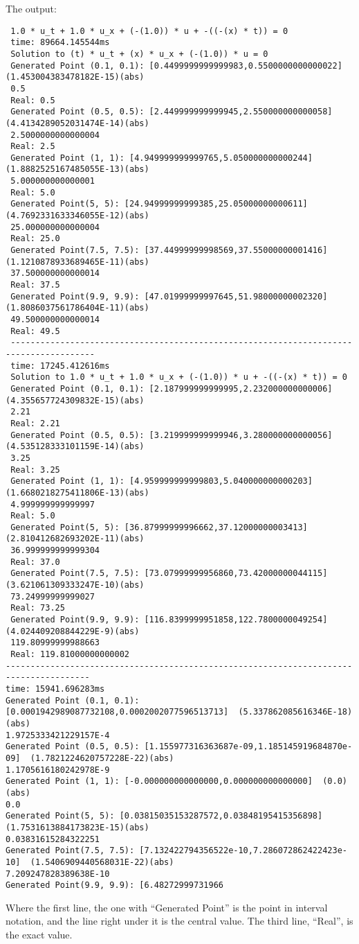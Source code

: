 \noindent The output:
\begingroup
\fontsize{9pt}{12pt}
\begin{verbatim}
 1.0 * u_t + 1.0 * u_x + (-(1.0)) * u + -((-(x) * t)) = 0
 time: 89664.145544ms
 Solution to (t) * u_t + (x) * u_x + (-(1.0)) * u = 0
 Generated Point (0.1, 0.1): [0.4499999999999983,0.5500000000000022]  (1.453004383478182E-15)(abs)
 0.5
 Real: 0.5
 Generated Point (0.5, 0.5): [2.449999999999945,2.550000000000058]  (4.4134289052031474E-14)(abs)
 2.5000000000000004
 Real: 2.5
 Generated Point (1, 1): [4.949999999999765,5.050000000000244]  (1.8882525167485055E-13)(abs)
 5.000000000000001
 Real: 5.0
 Generated Point(5, 5): [24.94999999999385,25.05000000000611]  (4.7692331633346055E-12)(abs)
 25.000000000000004
 Real: 25.0
 Generated Point(7.5, 7.5): [37.44999999998569,37.55000000001416]  (1.1210878933689465E-11)(abs)
 37.500000000000014
 Real: 37.5
 Generated Point(9.9, 9.9): [47.01999999997645,51.98000000002320]  (1.8086037561786404E-11)(abs)
 49.500000000000014
 Real: 49.5
 ---------------------------------------------------------------------------------------
 time: 17245.412616ms
 Solution to 1.0 * u_t + 1.0 * u_x + (-(1.0)) * u + -((-(x) * t)) = 0
 Generated Point (0.1, 0.1): [2.187999999999995,2.232000000000006]  (4.355657724309832E-15)(abs)
 2.21
 Real: 2.21
 Generated Point (0.5, 0.5): [3.219999999999946,3.280000000000056]  (4.535128333101159E-14)(abs)
 3.25
 Real: 3.25
 Generated Point (1, 1): [4.959999999999803,5.040000000000203]  (1.6680218275411806E-13)(abs)
 4.999999999999997
 Real: 5.0
 Generated Point(5, 5): [36.87999999996662,37.12000000003413]  (2.810412682693202E-11)(abs)
 36.999999999999304
 Real: 37.0
 Generated Point(7.5, 7.5): [73.07999999956860,73.42000000044115]  (3.621061309333247E-10)(abs)
 73.24999999999027
 Real: 73.25
 Generated Point(9.9, 9.9): [116.8399999951858,122.7800000049254]  (4.024409208844229E-9)(abs)
 119.80999999988663
 Real: 119.81000000000002
---------------------------------------------------------------------------------------
time: 15941.696283ms
Generated Point (0.1, 0.1): [0.0001942989087732108,0.0002002077596513713]  (5.337862085616346E-18)(abs)
1.9725333421229157E-4
Generated Point (0.5, 0.5): [1.155977316363687e-09,1.185145919684870e-09]  (1.7821224620757228E-22)(abs)
1.1705616180242978E-9
Generated Point (1, 1): [-0.000000000000000,0.000000000000000]  (0.0)(abs)
0.0
Generated Point(5, 5): [0.03815035153287572,0.03848195415356898]  (1.7531613884173823E-15)(abs)
0.03831615284322251
Generated Point(7.5, 7.5): [7.132422794356522e-10,7.286072862422423e-10]  (1.5406909440568031E-22)(abs)
7.209247828389638E-10
Generated Point(9.9, 9.9): [6.48272999731966
\end{verbatim}
\endgroup
Where the first line, the one with ``Generated Point'' is the point in
interval notation, and the line right under it is the central
value. The third line, ``Real'', is the exact value.
